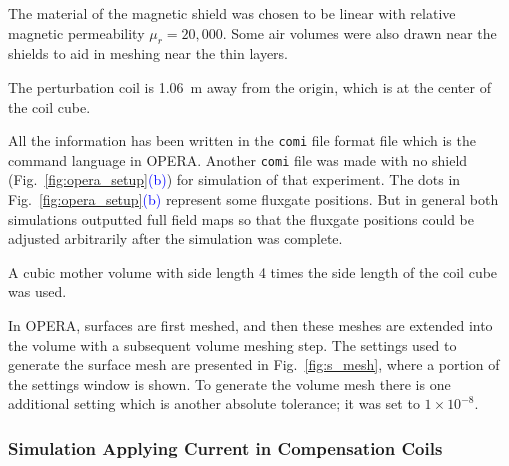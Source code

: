The material of the magnetic shield was chosen to be linear with
relative magnetic permeability $\mu_r=20,000$.  Some air volumes were
also drawn near the shields to aid in meshing near the thin layers.

The perturbation coil is 1.06~m away from the origin, which is at the
center of the coil cube.

All the information has been written in the {\tt comi} file format
file which is the command language in OPERA. Another {\tt comi} file
was made with no shield
(Fig.~\ref{fig:opera_setup}\textcolor{blue}{(b)}) for simulation of
that experiment.  The dots in
Fig.~\ref{fig:opera_setup}\textcolor{blue}{(b)} represent some
fluxgate positions.  But in general both simulations outputted full
field maps so that the fluxgate positions could be adjusted
arbitrarily after the simulation was complete.

A cubic mother volume with side length 4 times the side length of the
coil cube was used.



In OPERA, surfaces are first meshed, and then these meshes are
extended into the volume with a subsequent volume meshing step.
The settings used to generate the surface mesh are presented in
Fig.~\ref{fig:s_mesh}, where a portion of the settings window is
shown.  To generate the volume mesh there is one additional setting
which is another absolute tolerance; it was set to $1\times10^{-8}$.

\subsubsection{Simulation Applying Current in Compensation Coils}\label{sec:mSim}


